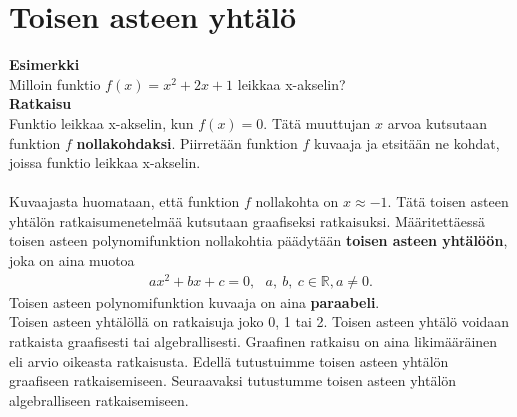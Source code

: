 \chapter{Toisen asteen yhtälö}
\textbf{Esimerkki} \\
Milloin funktio $f(x)=x^2+2x+1$ leikkaa x-akselin? \\ 
\textbf{Ratkaisu} \\
Funktio leikkaa x-akselin, kun $f(x)=0$. Tätä muuttujan $x$ arvoa kutsutaan funktion $f$ \textbf{nollakohdaksi}. Piirretään funktion $f$ kuvaaja ja etsitään ne kohdat, joissa funktio leikkaa x-akselin. %
\\ \\
Kuvaajasta huomataan, että funktion $f$ nollakohta on $x \approx -1$. Tätä toisen asteen yhtälön ratkaisumenetelmää kutsutaan graafiseksi ratkaisuksi.
Määritettäessä toisen asteen polynomifunktion nollakohtia päädytään \textbf{toisen asteen yhtälöön}, joka on aina muotoa
\begin{align*}
ax^2+bx+c=0, \ \ \ a, \ b, \ c  \in \mathbb{R}, a \neq 0.
\end{align*}
Toisen asteen polynomifunktion kuvaaja on aina \textbf{paraabeli}. \\

Toisen asteen yhtälöllä on ratkaisuja joko 0, 1 tai 2.
Toisen asteen yhtälö voidaan ratkaista graafisesti tai algebrallisesti. Graafinen ratkaisu on aina likimääräinen eli arvio oikeasta ratkaisusta. Edellä tutustuimme toisen asteen yhtälön graafiseen ratkaisemiseen. Seuraavaksi tutustumme toisen asteen yhtälön algebralliseen ratkaisemiseen.
